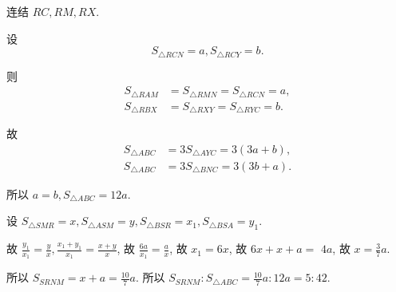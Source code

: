 \documentclass{March}
\begin{document}
\begin{solution}
	连结 $R C ,  R M ,  R X$.

	设
	$$
		S_{\triangle R C N}=a, S_{\triangle R C Y}=b .
	$$

	则
	\begin{align*}
		S_{\triangle R A M} & =S_{\triangle R M N}=S_{\triangle R C N}=a,  \\
		S_{\triangle R B X} & =S_{\triangle R X Y}=S_{\triangle R Y C}=b .
	\end{align*}

	故
	\begin{align*}
		S_{\triangle A B C} & =3 S_{\triangle A Y C}=3(3 a+b),  \\
		S_{\triangle A B C} & =3 S_{\triangle B N C}=3(3 b+a) .
	\end{align*}

	所以 $a=b, S_{\triangle A B C}=12 a$.

	设 $S_{\triangle S M R}=x, S_{\triangle A S M}=y, S_{\triangle B S R}=x_1, S_{\triangle B S A}=y_1$.

	故 $\frac{y_1}{x_1}=\frac{y}{x}, \frac{x_1+y_1}{x_1}=\frac{x+y}{x}$, 故 $\frac{6 a}{x_1}=\frac{a}{x}$, 故 $x_1=6 x$, 故 $6 x+x+a=$ $4 a$, 故 $x=\frac{3}{7} a$.

	所以 $S_{S R N M}=x+a=\frac{10}{7} a$. 所以 $S_{S R N M}: S_{\triangle A B C}=\frac{10}{7} a: 12 a=5: 42$.
\end{solution}
\end{document}
